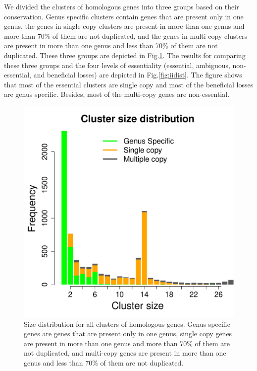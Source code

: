 \documentclass[12pt,letterpaper]{article}
\begin{document}
We divided the clusters of homologous genes into three groups based on their conservation. Genus specific clusters contain genes that are present only in one genus, the genes in single copy clusters are present in more than one genus and more than 70\% of them are not duplicated, and  the genes in multi-copy clusters are present in more than one genus and less than 70\% of them are not duplicated. These three groups are depicted in Fig.\@ \ref{fig:homclust-results}. The results for comparing these three groups and the four levels of essentiality (essential, ambiguous, non-essential, and beneficial losses) are depicted in Fig.\@ \ref{fig:iidist}. The figure shows that most of the essential clusters are single copy and most of the beneficial losses are genus specific. Besides, most of the multi-copy genes are non-essential.

\begin{figure}
\includegraphics[scale=0.3]{cluster-size-dist.pdf}
\caption{Size distribution for all clusters of homologous genes. Genus specific genes are genes that are present only in one genus, single copy genes are present in more than one genus and more than 70\% of them are not duplicated, and multi-copy genes are present in more than one genus and less than 70\% of them are not duplicated.}
\label{fig:homclust-results}
\end{figure}
\end{document}
